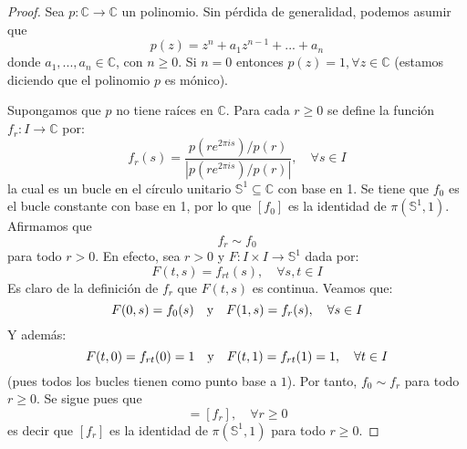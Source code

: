 \documentclass{article}
\newcounter{it}
\theoremstyle{largebreak}
\newcommand\abs[1]{\ensuremath{\left|#1\right|}}
\newcommand\cf[3]{\ensuremath{#1:#2\rightarrow#3}}
\begin{document}
    \begin{proof}
        Sea $\cf{p}{\mathbb{C}}{\mathbb{C}}$ un polinomio. Sin pérdida de generalidad, podemos asumir que
        \begin{equation*}
            p(z)=z^{ n}+a_1z^{ n-1}+...+a_n
        \end{equation*}
        donde $a_1,...,a_n\in\mathbb{C}$, con $n\geq0$. Si $n=0$ entonces $p(z)=1,\forall z\in\mathbb{C}$ (estamos diciendo que el polinomio $p$ es mónico).

        Supongamos que $p$ no tiene raíces en $\mathbb{C}$. Para cada $r\geq 0$ se define la función $\cf{f_r}{I}{\mathbb{C}}$ por:
        \begin{equation*}
            f_r(s)=\frac{p(re^{ 2\pi is})/p(r)}{\abs{p(re^{ 2\pi is})/p(r)}},\quad\forall s\in I
        \end{equation*}
        la cual es un bucle en el círculo unitario $\mathbb{S}^1\subseteq\mathbb{C}$ con base en 1. Se tiene que $f_0$ es el bucle constante con base en 1, por lo que $[f_0]$ es la identidad de $\pi(\mathbb{S}^1,1)$. Afirmamos que
        \begin{equation*}
            f_r\sim f_0
        \end{equation*}
        para todo $r>0$. En efecto, sea $r>0$ y $\cf{F}{I\times I}{\mathbb{S}^1}$ dada por:
        \begin{equation*}
            F(t,s)=f_{ rt}(s),\quad\forall  s,t\in I
        \end{equation*}
        Es claro de la definición de $f_r$ que $F(t,s)$ es continua. Veamos que:
        \begin{equation*}
            F(0,s)=f_0(s)\quad\textup{y}\quad F(1,s)=f_r(s),\quad\forall s\in I
        \end{equation*}
        Y además:
        \begin{equation*}
            F(t,0)=f_{ rt}(0)=1\quad\textup{y}\quad F(t,1)=f_{ rt}(1)=1,\quad\forall t\in I
        \end{equation*}
        (pues todos los bucles tienen como punto base a $1$). Por tanto, $f_0\sim f_r$ para todo $r\geq0$. Se sigue pues que
        \begin{equation*}
            [f_0]=[f_r],\quad\forall r\geq0
        \end{equation*}
        es decir que $[f_r]$ es la identidad de $\pi(\mathbb{S}^1,1)$ para todo $r\geq0$.


\end{proof}
\end{document}
